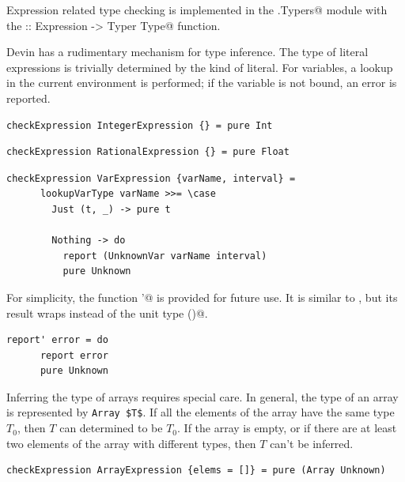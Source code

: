 \documentclass[UdineBachThesis,american,11pt,draft]{PhdThesis}
\begin{document}
  Expression related type checking is implemented in the
  \lstinline@Devin.Typers@ module with the
  \lstinline@checkExpression :: Expression -> Typer Type@ function.

  Devin has a rudimentary mechanism for type inference. The type of literal
  expressions is trivially determined by the kind of literal. For variables, a
  lookup in the current environment is performed; if the variable is not bound,
  an error is reported.

  \begin{lstlisting}[gobble=4,basicstyle=\ttfamily\small]
    checkExpression IntegerExpression {} = pure Int
  \end{lstlisting}

  \begin{lstlisting}[gobble=4,basicstyle=\ttfamily\small]
    checkExpression RationalExpression {} = pure Float
  \end{lstlisting}

  \begin{lstlisting}[gobble=4,basicstyle=\ttfamily\small]
    checkExpression VarExpression {varName, interval} =
      lookupVarType varName >>= \case
        Just (t, _) -> pure t

        Nothing -> do
          report (UnknownVar varName interval)
          pure Unknown
  \end{lstlisting}

  For simplicity, the function \lstinline@report'@ is provided for future use.
  It is similar to \lstinline@report@, but its result wraps
  \lstinline@Unknown@ instead of the unit type \lstinline@()@.

  \begin{lstlisting}[gobble=4,basicstyle=\ttfamily\small]
    report' error = do
      report error
      pure Unknown
  \end{lstlisting}

  Inferring the type of arrays requires special care. In general, the type of an
  array is represented by \lstinline[mathescape]@Array $T$@. If all the elements
  of the array have the same type $T_0$, then $T$ can determined to be $T_0$. If
  the array is empty, or if there are at least two elements of the array with
  different types, then $T$ can't be inferred.

  \begin{lstlisting}[gobble=4,basicstyle=\ttfamily\small]
    checkExpression ArrayExpression {elems = []} = pure (Array Unknown)
  \end{lstlisting}
\end{document}
